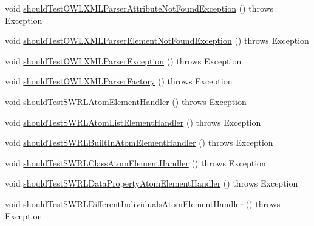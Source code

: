 \begin{DoxyCompactItemize}
\item 
void \hyperlink{classorg_1_1semanticweb_1_1owlapi_1_1contract_1_1_contract_owlxmlparser_test_a3ec6c0d7f4f40bc0cbb574134a3b1239}{should\-Test\-O\-W\-L\-X\-M\-L\-Parser\-Attribute\-Not\-Found\-Exception} ()  throws Exception 
\item 
void \hyperlink{classorg_1_1semanticweb_1_1owlapi_1_1contract_1_1_contract_owlxmlparser_test_aed644fca26176b3a242ad0b2b80928eb}{should\-Test\-O\-W\-L\-X\-M\-L\-Parser\-Element\-Not\-Found\-Exception} ()  throws Exception 
\item 
void \hyperlink{classorg_1_1semanticweb_1_1owlapi_1_1contract_1_1_contract_owlxmlparser_test_a22911ee9f5ec47968eec570d61a4f1c2}{should\-Test\-O\-W\-L\-X\-M\-L\-Parser\-Exception} ()  throws Exception 
\item 
void \hyperlink{classorg_1_1semanticweb_1_1owlapi_1_1contract_1_1_contract_owlxmlparser_test_a8d9130d1d21a64cdf27f199cdc24bc22}{should\-Test\-O\-W\-L\-X\-M\-L\-Parser\-Factory} ()  throws Exception 
\item 
void \hyperlink{classorg_1_1semanticweb_1_1owlapi_1_1contract_1_1_contract_owlxmlparser_test_a7075f69e0936085bea46f98296abbea8}{should\-Test\-S\-W\-R\-L\-Atom\-Element\-Handler} ()  throws Exception 
\item 
void \hyperlink{classorg_1_1semanticweb_1_1owlapi_1_1contract_1_1_contract_owlxmlparser_test_a5af105e79a182bfa30b9e537aa68ab5e}{should\-Test\-S\-W\-R\-L\-Atom\-List\-Element\-Handler} ()  throws Exception 
\item 
void \hyperlink{classorg_1_1semanticweb_1_1owlapi_1_1contract_1_1_contract_owlxmlparser_test_a13463a10541f412c852b259f62b4a12d}{should\-Test\-S\-W\-R\-L\-Built\-In\-Atom\-Element\-Handler} ()  throws Exception 
\item 
void \hyperlink{classorg_1_1semanticweb_1_1owlapi_1_1contract_1_1_contract_owlxmlparser_test_a5fd0cf4dec001d689907dcf34756bb72}{should\-Test\-S\-W\-R\-L\-Class\-Atom\-Element\-Handler} ()  throws Exception 
\item 
void \hyperlink{classorg_1_1semanticweb_1_1owlapi_1_1contract_1_1_contract_owlxmlparser_test_ab23b30ec1bf5268d508112ff165c9a64}{should\-Test\-S\-W\-R\-L\-Data\-Property\-Atom\-Element\-Handler} ()  throws Exception 
\item 
void \hyperlink{classorg_1_1semanticweb_1_1owlapi_1_1contract_1_1_contract_owlxmlparser_test_ac502e029773bc432f615f5f462b5e361}{should\-Test\-S\-W\-R\-L\-Different\-Individuals\-Atom\-Element\-Handler} ()  throws Exception 
\item 

\end{DoxyCompactItemize}
